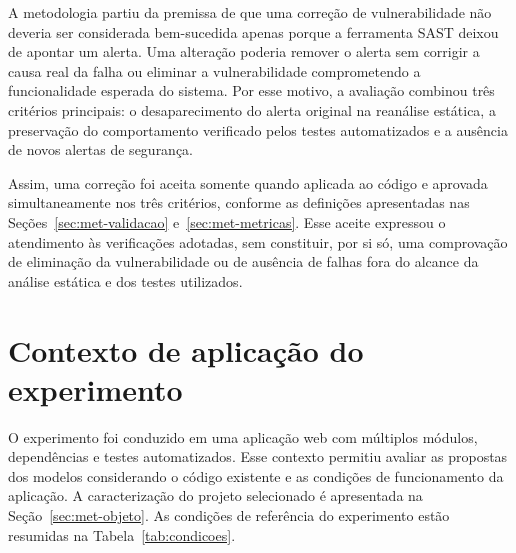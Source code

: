 A metodologia partiu da premissa de que uma correção de vulnerabilidade não deveria ser considerada bem-sucedida apenas porque a ferramenta SAST deixou de apontar um alerta. Uma alteração poderia remover o alerta sem corrigir a causa real da falha ou eliminar a vulnerabilidade comprometendo a funcionalidade esperada do sistema. Por esse motivo, a avaliação combinou três critérios principais: o desaparecimento do alerta original na reanálise estática, a preservação do comportamento verificado pelos testes automatizados e a ausência de novos alertas de segurança.

Assim, uma correção foi aceita somente quando aplicada ao código e aprovada simultaneamente nos três critérios, conforme as definições apresentadas nas Seções~\ref{sec:met-validacao} e~\ref{sec:met-metricas}. Esse aceite expressou o atendimento às verificações adotadas, sem constituir, por si só, uma comprovação de eliminação da vulnerabilidade ou de ausência de falhas fora do alcance da análise estática e dos testes utilizados.

\section{Contexto de aplicação do experimento}
\label{sec:met-contexto}

O experimento foi conduzido em uma aplicação web com múltiplos módulos, dependências e testes automatizados. Esse contexto permitiu avaliar as propostas dos modelos considerando o código existente e as condições de funcionamento da aplicação. A caracterização do projeto selecionado é apresentada na Seção~\ref{sec:met-objeto}. As condições de referência do experimento estão resumidas na Tabela~\ref{tab:condicoes}.

